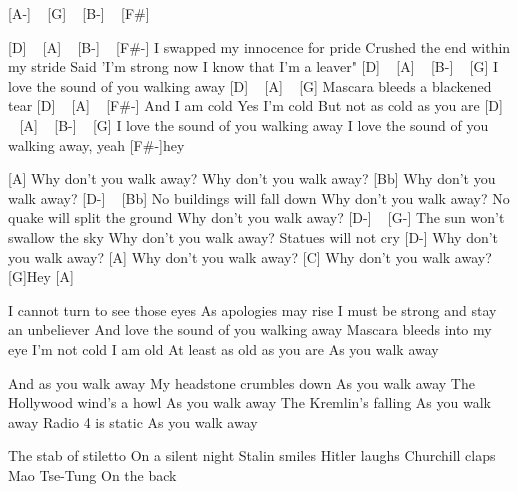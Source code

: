 [A-] ~ [G] ~ [B-] ~ [F#]

[D] ~ [A] ~ [B-] ~ [F#-]
I swapped my innocence for pride
Crushed the end within my stride
Said 'I'm strong now I know that I'm a leaver"
[D] ~ [A] ~ [B-] ~ [G]
I love the sound of you walking away
[D] ~ [A] ~ [G]
Mascara bleeds a blackened tear
[D] ~ [A] ~ [F#-]
And I am cold
Yes I'm cold
But not as cold as you are
[D] ~ [A] ~ [B-] ~ [G]
I love the sound of you walking away
I love the sound of you walking away, yeah [F#-]hey

[A]
Why don't you walk away?
Why don't you walk away?
[Bb] Why don't you walk away?
[D-] ~ [Bb]
No buildings will fall down
Why don't you walk away?
No quake will split the ground
Why don't you walk away?
[D-] ~ [G-]
The sun won't swallow the sky
Why don't you walk away?
Statues will not cry
[D-]
Why don't you walk away?
[A] Why don't you walk away?
[C] Why don't you walk away?
[G]Hey [A]

I cannot turn to see those eyes
As apologies may rise
I must be strong and stay an unbeliever
And love the sound of you walking away
Mascara bleeds into my eye
I'm not cold
I am old
At least as old as you are
As you walk away

And as you walk away
My headstone crumbles down
As you walk away
The Hollywood wind's a howl
As you walk away
The Kremlin's falling
As you walk away
Radio 4 is static
As you walk away

The stab of stiletto
On a silent night
Stalin smiles
Hitler laughs
Churchill claps
Mao Tse-Tung
On the back
